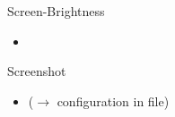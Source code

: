 \begin{frame}[fragile]{Screen-Brightness}
  \begin{itemize}
    \item {}
  \end{itemize}
\end{frame}

\begin{frame}[fragile]{Screenshot}
  \begin{itemize}
    \item {} ($\rightarrow$ configuration in  file)
  \end{itemize}
\end{frame}
